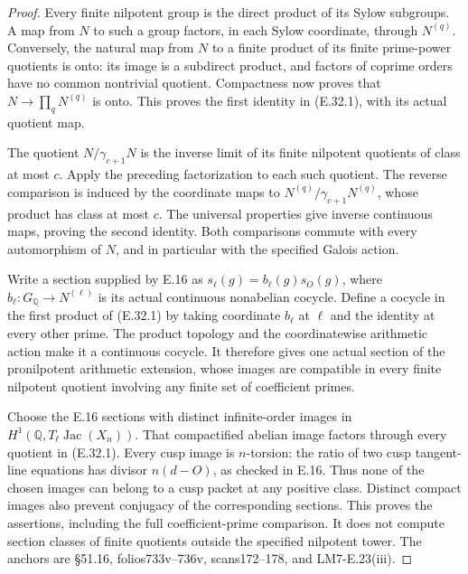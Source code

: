 \documentclass[11pt,oneside]{article}
\begin{document}
\begin{proof}
Every finite nilpotent group is the direct product of its
Sylow subgroups. A map from $N$ to such a group factors,
in each Sylow coordinate, through $N^{(q)}$. Conversely,
the natural map from $N$ to a finite product of its finite
prime-power quotients is onto: its image is a subdirect
product, and factors of coprime orders have no common
nontrivial quotient. Compactness now proves that
$N\to\prod_qN^{(q)}$ is onto. This proves the first
identity in (E.32.1), with its actual quotient map.

The quotient $N/\gamma_{c+1}N$ is the inverse limit of
its finite nilpotent quotients of class at most $c$.
Apply the preceding factorization to each such quotient.
The reverse comparison is induced by the coordinate
maps to $N^{(q)}/\gamma_{c+1}N^{(q)}$, whose product has
class at most $c$. The universal properties give inverse
continuous maps, proving the second identity. Both
comparisons commute with every automorphism of $N$,
and in particular with the specified Galois action.

Write a section supplied by E.16 as
$s_\ell(g)=b_\ell(g)s_O(g)$, where
$b_\ell:G_{\mathbb Q}\to N^{(\ell)}$ is its actual
continuous nonabelian cocycle. Define a cocycle in the
first product of (E.32.1) by taking coordinate
$b_\ell$ at $\ell$ and the identity at every other prime.
The product topology and the coordinatewise arithmetic
action make it a continuous cocycle. It therefore gives
one actual section of the pronilpotent arithmetic
extension, whose images are compatible in every
finite nilpotent quotient involving any finite set
of coefficient primes.

Choose the E.16 sections with distinct infinite-order
images in
$H^1(\mathbb Q,T_\ell\operatorname{Jac}(X_n))$.
That compactified abelian image factors through every
quotient in (E.32.1). Every cusp image is $n$-torsion:
the ratio of two cusp tangent-line equations has
divisor $n(d-O)$, as checked in E.16. Thus none of the
chosen images can belong to a cusp packet at any
positive class. Distinct compact images also prevent
conjugacy of the corresponding sections. This proves
the assertions, including the full coefficient-prime
comparison. It does not compute section classes of
finite quotients outside the specified nilpotent
tower. The anchors are \S51.16, folios733v--736v,
scans172--178, and LM7-E.23(iii).
\end{proof}
\end{document}
